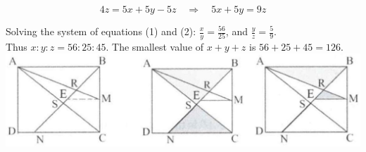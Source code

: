\documentclass{article}
\begin{document}
\[
4 z=5 x+5 y-5 z \quad \Rightarrow \quad 5 x+5 y=9 z
\]

Solving the system of equations (1) and (2): \(\frac{x}{y}=\frac{56}{25}\), and \(\frac{y}{z}=\frac{5}{9}\).\\
Thus \(x: y: z=56: 25: 45\). The smallest value of \(x+y+z\) is \(56+25+45=126\).\\
\centering
\includegraphics[width=\textwidth]{images/135(2).jpg}
\end{document}
